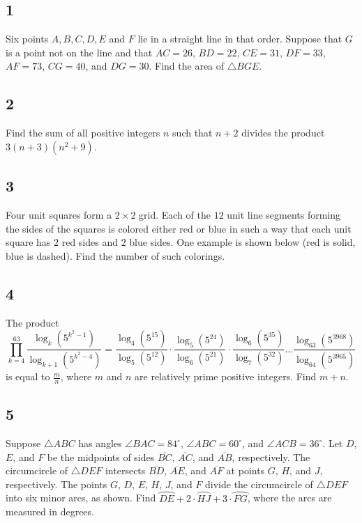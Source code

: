 \subsection{1}
Six points $A, B, C, D, E$ and $F$ lie in a straight line in that order. Suppose that $G$ is a point not on the line and that $AC = 26$, $BD = 22$, $CE = 31$, $DF = 33$, $AF = 73$, $CG = 40$, and $DG = 30$. Find the area of $\triangle BGE$.

\subsection{2}
Find the sum of all positive integers $n$ such that $n+2$ divides the product $3(n+3)(n^2+9)$.

\subsection{3}
Four unit squares form a $2\times 2$ grid. Each of the $12$ unit line segments forming the sides of the squares is colored either red or blue in such a way that each unit square has $2$ red sides and $2$ blue sides. One example is shown below (red is solid, blue is dashed). Find the number of such colorings.


\subsection{4}
The product
$$\prod_{k=4}^{63} \frac{\log_k \left(5^{k^2 - 1}\right)}{\log_{k+1} \left(5^{k^2 - 4}\right)} = \frac{\log_4 (5^{15})}{\log_5 (5^{12})} \cdot \frac{\log_5 (5^{24})}{\log_6 (5^{21})} \cdot \frac{\log_6 (5^{35})}{\log_7 (5^{32})} \dots \frac{\log_{63} (5^{3968})}{\log_{64} (5^{3965})}$$
is equal to $\frac{m}{n}$, where $m$ and $n$ are relatively prime positive integers. Find $m + n$.

\subsection{5}
Suppose $\triangle ABC$ has angles $\angle BAC = 84^\circ$, $\angle ABC = 60^\circ$, and $\angle ACB = 36^\circ$. Let $D$, $E$, and $F$ be the midpoints of sides $\overline{BC}$, $\overline{AC}$, and $\overline{AB}$, respectively. The circumcircle of $\triangle DEF$ intersects $\overline{BD}$, $\overline{AE}$, and $\overline{AF}$ at points $G$, $H$, and $J$, respectively. The points $G$, $D$, $E$, $H$, $J$, and $F$ divide the circumcircle of $\triangle DEF$ into six minor arcs, as shown. Find $\wideparen{DE} + 2 \cdot \wideparen{HJ} + 3 \cdot \wideparen{FG}$, where the arcs are measured in degrees.

